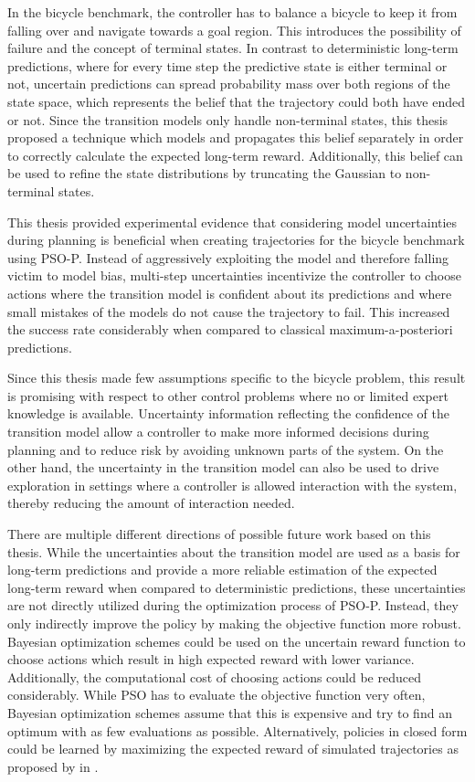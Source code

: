 In the bicycle benchmark, the controller has to balance a bicycle to keep it from falling over and navigate towards a goal region.
This introduces the possibility of failure and the concept of terminal states.
In contrast to deterministic long-term predictions, where for every time step the predictive state is either terminal or not, uncertain predictions can spread probability mass over both regions of the state space, which represents the belief that the trajectory could both have ended or not.
Since the transition models only handle non-terminal states, this thesis proposed a technique which models and propagates this belief separately in order to correctly calculate the expected long-term reward.
Additionally, this belief can be used to refine the state distributions by truncating the Gaussian to non-terminal states.

This thesis provided experimental evidence that considering model uncertainties during planning is beneficial when creating trajectories for the bicycle benchmark using PSO-P.
Instead of aggressively exploiting the model and therefore falling victim to model bias, multi-step uncertainties incentivize the controller to choose actions where the transition model is confident about its predictions and where small mistakes of the models do not cause the trajectory to fail.
This increased the success rate considerably when compared to classical maximum-a-posteriori predictions.

Since this thesis made few assumptions specific to the bicycle problem, this result is promising with respect to other control problems where no or limited expert knowledge is available.
Uncertainty information reflecting the confidence of the transition model allow a controller to make more informed decisions during planning and to reduce risk by avoiding unknown parts of the system.
On the other hand, the uncertainty in the transition model can also be used to drive exploration in settings where a controller is allowed interaction with the system, thereby reducing the amount of interaction needed.

There are multiple different directions of possible future work based on this thesis.
While the uncertainties about the transition model are used as a basis for long-term predictions and provide a more reliable estimation of the expected long-term reward when compared to deterministic predictions, these uncertainties are not directly utilized during the optimization process of PSO-P.
Instead, they only indirectly improve the policy by making the objective function more robust.
Bayesian optimization schemes \cite{brochu_tutorial_2010} could be used on the uncertain reward function to choose actions which result in high expected reward with lower variance.
Additionally, the computational cost of choosing actions could be reduced considerably.
While PSO has to evaluate the objective function very often, Bayesian optimization schemes assume that this is expensive and try to find an optimum with as few evaluations as possible.
Alternatively, policies in closed form could be learned by maximizing the expected reward of simulated trajectories as proposed by \citeauthor{deisenroth_efficient_2010} in \cite{deisenroth_efficient_2010}.

